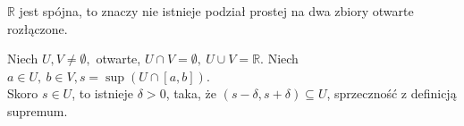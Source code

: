 \begin{tw} 
    $\mathbb{R}$ jest spójna, to znaczy nie istnieje podział prostej na dwa zbiory otwarte rozłączone.
\end{tw} 
\begin{dd}
    Niech $U,V \neq \emptyset,$ otwarte, $ U \cap V = \emptyset, \ U \cup V = \mathbb{R}$.
    Niech $a \in U, \ b \in V, s = \sup (U \cap [a,b])$. \\ Skoro $s \in U$, to istnieje $\delta > 0$, 
    taka, że $(s-\delta,s+\delta) \subseteq U$, sprzeczność z definicją supremum.
\end{dd}

